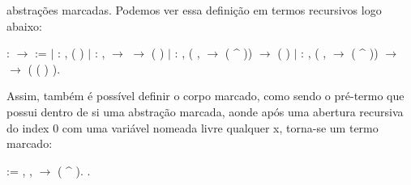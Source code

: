 abstrações marcadas. Podemos ver essa definição em termos recursivos logo abaixo:\begin{coqdoccode}
\coqdocemptyline
\coqdocnoindent
{}  :  \ensuremath{\rightarrow}  :=\coqdoceol
\coqdocindent{1.00em}
\ensuremath{|}  : \coqdockw{\ensuremath{\forall}} ,\coqdoceol
\coqdocindent{3.00em}
 ( )\coqdoceol
\coqdocindent{1.00em}
\ensuremath{|}  : \coqdockw{\ensuremath{\forall}}  ,\coqdoceol
\coqdocindent{3.00em}
  \ensuremath{\rightarrow} \coqdoceol
\coqdocindent{3.00em}
  \ensuremath{\rightarrow} \coqdoceol
\coqdocindent{3.00em}
 (  )\coqdoceol
\coqdocindent{1.00em}
\ensuremath{|}  : \coqdockw{\ensuremath{\forall}}  ,\coqdoceol
\coqdocindent{3.00em}
(\coqdockw{\ensuremath{\forall}} ,    \ensuremath{\rightarrow}  ( \^{} )) \ensuremath{\rightarrow}\coqdoceol
\coqdocindent{3.00em}
 ( )\coqdoceol
\coqdocindent{1.00em}
\ensuremath{|}  : \coqdockw{\ensuremath{\forall}}   ,\coqdoceol
\coqdocindent{3.00em}
(\coqdockw{\ensuremath{\forall}} ,    \ensuremath{\rightarrow}  ( \^{} )) \ensuremath{\rightarrow}\coqdoceol
\coqdocindent{3.00em}
  \ensuremath{\rightarrow}\coqdoceol
\coqdocindent{3.00em}
 ( ( ) ).\coqdoceol
\coqdocemptyline
\end{coqdoccode}
Assim, também é possível definir o corpo marcado, como sendo o pré-termo que possui dentro de 
si uma abstração marcada, aonde após uma abertura recursiva do index 0 com uma variável nomeada 
livre qualquer x, torna-se um termo marcado:\begin{coqdoccode}
\coqdocemptyline
\coqdocnoindent
{}   :=\coqdoceol
\coqdocindent{1.00em}
\coqdoctac{\ensuremath{\exists}} , \coqdockw{\ensuremath{\forall}} ,    \ensuremath{\rightarrow}  ( \^{} ).\coqdoceol
\coqdocemptyline
\coqdocnoindent
{}  .\coqdoceol
\coqdocemptyline
\coqdocemptyline
\coqdocemptyline
\end{coqdoccode}
